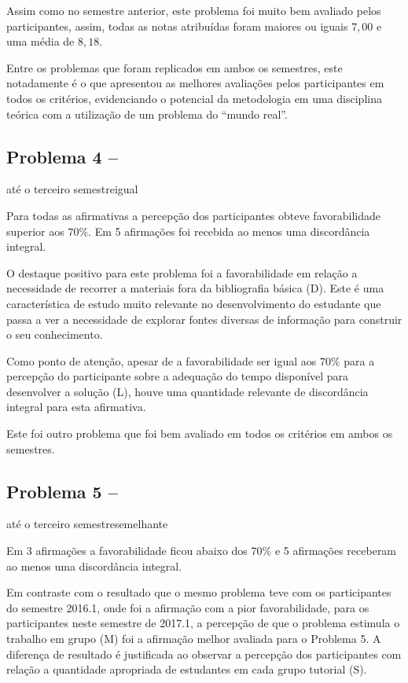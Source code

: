 Assim como no semestre anterior, este problema foi muito bem avaliado
pelos participantes, assim, todas as notas atribuídas foram maiores
ou iguais $7,00$ e uma média de $8,18$.

Entre os problemas que foram replicados em ambos os semestres, este
notadamente é o que apresentou as melhores avaliações pelos participantes
em todos os critérios, evidenciando o potencial da metodologia em uma
disciplina teórica com a utilização de um problema do ``mundo real''.

\subsection{Problema 4 -- \ProblemaD}
{até o terceiro semestre}{igual}

Para todas as afirmativas a percepção dos participantes obteve favorabilidade
superior aos $70\%$. Em 5 afirmações foi recebida ao menos uma discordância
integral.

O destaque positivo para este problema foi a favorabilidade em relação
a necessidade de recorrer a materiais fora da bibliografia básica (D).
Este é uma característica de estudo muito relevante no desenvolvimento
do estudante que passa a ver a necessidade de explorar fontes diversas
de informação para construir o seu conhecimento.

Como ponto de atenção, apesar de a favorabilidade ser igual aos $70\%$ para
a percepção do participante sobre a adequação do tempo disponível para desenvolver
a solução (L), houve uma quantidade relevante de discordância integral para esta afirmativa.

Este foi outro problema que foi bem avaliado em todos os critérios em ambos
os semestres.

\subsection{Problema 5 -- \ProblemaE}
{até o terceiro semestre}{semelhante}

Em 3 afirmações a favorabilidade ficou abaixo dos $70\%$ e 5 afirmações
receberam ao menos uma discordância integral.

Em contraste com o resultado que o mesmo problema teve com
os participantes do semestre 2016.1, onde foi a afirmação com a
pior favorabilidade, para os participantes neste semestre de
2017.1, a percepção de que o problema estimula o
trabalho em grupo (M) foi a afirmação melhor avaliada
para o Problema 5.
A diferença de resultado é justificada ao observar
a percepção dos participantes com relação a quantidade
apropriada de estudantes em cada grupo tutorial (S).

